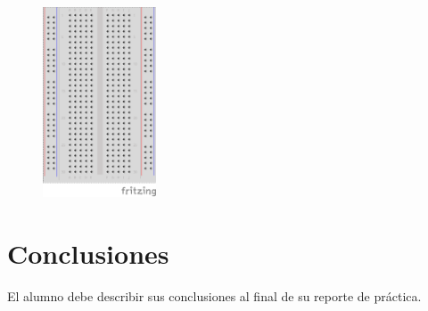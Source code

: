 \documentclass[paper=letter, fontsize=11pt]{scrartcl} %
\numberwithin{equation}{section} %
\numberwithin{figure}{section} %
\numberwithin{table}{section} %
\begin{document}
    \begin{figure}[h]
    	\begin{center}
    		\includegraphics[width=0.3\textwidth]{protoboard.png} %
    	\end{center}
    \end{figure}


\section{Conclusiones}
	El alumno debe describir sus conclusiones al final de su reporte de práctica.
    
\end{document}
